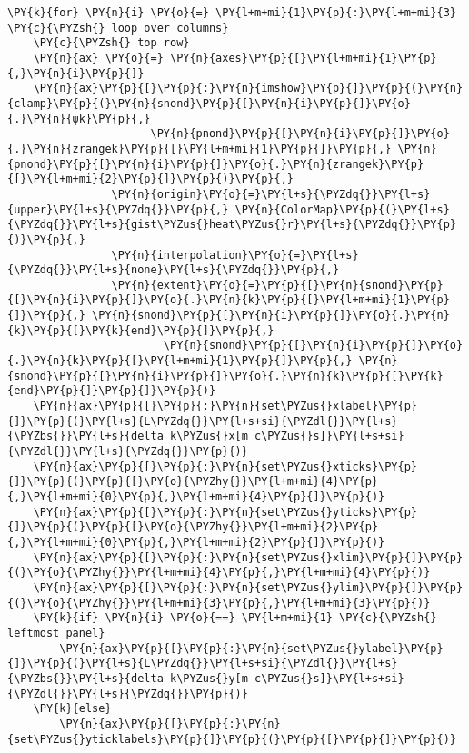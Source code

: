 \begin{Verbatim}[commandchars=\\\{\}]
\PY{k}{for} \PY{n}{i} \PY{o}{=} \PY{l+m+mi}{1}\PY{p}{:}\PY{l+m+mi}{3} \PY{c}{\PYZsh{} loop over columns}
    \PY{c}{\PYZsh{} top row}
    \PY{n}{ax} \PY{o}{=} \PY{n}{axes}\PY{p}{[}\PY{l+m+mi}{1}\PY{p}{,}\PY{n}{i}\PY{p}{]}
    \PY{n}{ax}\PY{p}{[}\PY{p}{:}\PY{n}{imshow}\PY{p}{]}\PY{p}{(}\PY{n}{clamp}\PY{p}{(}\PY{n}{snond}\PY{p}{[}\PY{n}{i}\PY{p}{]}\PY{o}{.}\PY{n}{ψk}\PY{p}{,}
                      \PY{n}{pnond}\PY{p}{[}\PY{n}{i}\PY{p}{]}\PY{o}{.}\PY{n}{zrangek}\PY{p}{[}\PY{l+m+mi}{1}\PY{p}{]}\PY{p}{,} \PY{n}{pnond}\PY{p}{[}\PY{n}{i}\PY{p}{]}\PY{o}{.}\PY{n}{zrangek}\PY{p}{[}\PY{l+m+mi}{2}\PY{p}{]}\PY{p}{)}\PY{p}{,}
                \PY{n}{origin}\PY{o}{=}\PY{l+s}{\PYZdq{}}\PY{l+s}{upper}\PY{l+s}{\PYZdq{}}\PY{p}{,} \PY{n}{ColorMap}\PY{p}{(}\PY{l+s}{\PYZdq{}}\PY{l+s}{gist\PYZus{}heat\PYZus{}r}\PY{l+s}{\PYZdq{}}\PY{p}{)}\PY{p}{,}
                \PY{n}{interpolation}\PY{o}{=}\PY{l+s}{\PYZdq{}}\PY{l+s}{none}\PY{l+s}{\PYZdq{}}\PY{p}{,}
                \PY{n}{extent}\PY{o}{=}\PY{p}{[}\PY{n}{snond}\PY{p}{[}\PY{n}{i}\PY{p}{]}\PY{o}{.}\PY{n}{k}\PY{p}{[}\PY{l+m+mi}{1}\PY{p}{]}\PY{p}{,} \PY{n}{snond}\PY{p}{[}\PY{n}{i}\PY{p}{]}\PY{o}{.}\PY{n}{k}\PY{p}{[}\PY{k}{end}\PY{p}{]}\PY{p}{,}
                        \PY{n}{snond}\PY{p}{[}\PY{n}{i}\PY{p}{]}\PY{o}{.}\PY{n}{k}\PY{p}{[}\PY{l+m+mi}{1}\PY{p}{]}\PY{p}{,} \PY{n}{snond}\PY{p}{[}\PY{n}{i}\PY{p}{]}\PY{o}{.}\PY{n}{k}\PY{p}{[}\PY{k}{end}\PY{p}{]}\PY{p}{]}\PY{p}{)}
    \PY{n}{ax}\PY{p}{[}\PY{p}{:}\PY{n}{set\PYZus{}xlabel}\PY{p}{]}\PY{p}{(}\PY{l+s}{L\PYZdq{}}\PY{l+s+si}{\PYZdl{}}\PY{l+s}{\PYZbs{}}\PY{l+s}{delta k\PYZus{}x[m c\PYZus{}s]}\PY{l+s+si}{\PYZdl{}}\PY{l+s}{\PYZdq{}}\PY{p}{)}
    \PY{n}{ax}\PY{p}{[}\PY{p}{:}\PY{n}{set\PYZus{}xticks}\PY{p}{]}\PY{p}{(}\PY{p}{[}\PY{o}{\PYZhy{}}\PY{l+m+mi}{4}\PY{p}{,}\PY{l+m+mi}{0}\PY{p}{,}\PY{l+m+mi}{4}\PY{p}{]}\PY{p}{)}
    \PY{n}{ax}\PY{p}{[}\PY{p}{:}\PY{n}{set\PYZus{}yticks}\PY{p}{]}\PY{p}{(}\PY{p}{[}\PY{o}{\PYZhy{}}\PY{l+m+mi}{2}\PY{p}{,}\PY{l+m+mi}{0}\PY{p}{,}\PY{l+m+mi}{2}\PY{p}{]}\PY{p}{)}
    \PY{n}{ax}\PY{p}{[}\PY{p}{:}\PY{n}{set\PYZus{}xlim}\PY{p}{]}\PY{p}{(}\PY{o}{\PYZhy{}}\PY{l+m+mi}{4}\PY{p}{,}\PY{l+m+mi}{4}\PY{p}{)}
    \PY{n}{ax}\PY{p}{[}\PY{p}{:}\PY{n}{set\PYZus{}ylim}\PY{p}{]}\PY{p}{(}\PY{o}{\PYZhy{}}\PY{l+m+mi}{3}\PY{p}{,}\PY{l+m+mi}{3}\PY{p}{)}
    \PY{k}{if} \PY{n}{i} \PY{o}{==} \PY{l+m+mi}{1} \PY{c}{\PYZsh{} leftmost panel}
        \PY{n}{ax}\PY{p}{[}\PY{p}{:}\PY{n}{set\PYZus{}ylabel}\PY{p}{]}\PY{p}{(}\PY{l+s}{L\PYZdq{}}\PY{l+s+si}{\PYZdl{}}\PY{l+s}{\PYZbs{}}\PY{l+s}{delta k\PYZus{}y[m c\PYZus{}s]}\PY{l+s+si}{\PYZdl{}}\PY{l+s}{\PYZdq{}}\PY{p}{)}
    \PY{k}{else}
        \PY{n}{ax}\PY{p}{[}\PY{p}{:}\PY{n}{set\PYZus{}yticklabels}\PY{p}{]}\PY{p}{(}\PY{p}{[}\PY{p}{]}\PY{p}{)}

\end{Verbatim}
